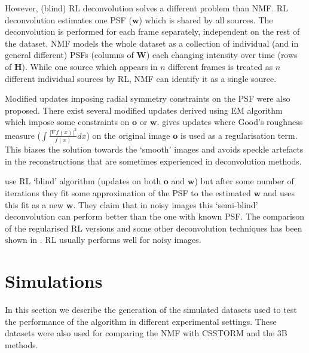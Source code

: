However, (blind) RL deconvolution solves a different problem than NMF. RL deconvolution estimates one PSF ($\bm{w}$) which is shared by all sources. The deconvolution is performed for each frame separately, independent on the rest of the dataset. NMF models the whole dataset as a collection of individual (and in general different) PSFs (columns of $\bm{W}$) each changing intensity over time (rows of $\bm{H}$). While one source which appears in $n$ different frames is treated as $n$ different individual sources by RL, NMF can identify it as a single source. 

Modified updates imposing radial symmetry constraints on the PSF were also proposed. There exist several modified updates derived using EM algorithm which impose some constraints on $\bm{o}$ or $\bm{w}$. \cite{Joshi:93} gives updates where Good's roughness measure ($\int\frac{\left|\nabla f(x)\right|^{2}}{f(x)}dx$) on the original image $\bm{o}$ is used as a regularisation term. This biases the solution towards the `smooth' images and avoids speckle artefacts in the reconstructions that are sometimes experienced in deconvolution methods. 

\cite{Fish:95} use RL `blind' algorithm (updates on both $\bm{o}$ and $\bm{w}$) but after some number of iterations they fit some approximation of the PSF to the estimated $\bm{w}$ and uses this fit as a new $\bm{w}$. They claim that in noisy images this `semi-blind' deconvolution can perform better than the one with known PSF. The comparison of the regularised RL versions and some other deconvolution techniques has been shown in \cite{Kempen1997BA,Verveer1999}. RL usually performs well for noisy images.


\clearpage
\section{Simulations \label{sec:simulations}}
In this section we describe the generation of the simulated datasets used to test the performance of the algorithm in different experimental settings. These datasets were also used for comparing the NMF with CSSTORM \cite{Zhu2012} and the 3B \cite{Cox2011} methods. 


